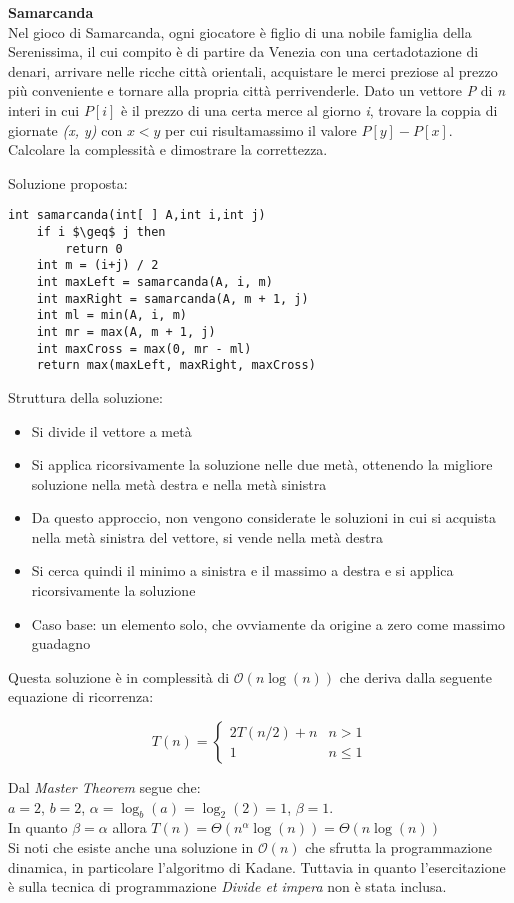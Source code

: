 \documentclass[../cheatSheetAlgoritmi.tex]{subfiles}
\begin{document}
\bigskip
\textbf{Samarcanda}\\
Nel gioco di Samarcanda, ogni giocatore è figlio di una nobile famiglia della Serenissima, il cui compito è di partire da Venezia con una certadotazione di denari, arrivare nelle ricche città orientali, acquistare le merci preziose al prezzo più conveniente e tornare alla propria città perrivenderle. Dato un vettore \textit{P} di \textit{n} interi in cui $P[i]$ è il prezzo di una certa merce al giorno \textit{i}, trovare la coppia di giornate \textit{(x, y)} con $x < y$ per cui risultamassimo il valore $P[y]-P[x]$. Calcolare la complessità e dimostrare la correttezza.

\bigskip
Soluzione proposta:
\begin{lstlisting}[caption=Samarcanda]
int samarcanda(int[ ] A,int i,int j)
	if i $\geq$ j then
    	return 0
  	int m = (i+j) / 2
  	int maxLeft = samarcanda(A, i, m)
  	int maxRight = samarcanda(A, m + 1, j)
  	int ml = min(A, i, m)
  	int mr = max(A, m + 1, j)
  	int maxCross = max(0, mr - ml)
  	return max(maxLeft, maxRight, maxCross)
\end{lstlisting}
Struttura della soluzione:
\begin{itemize}
	\item Si divide il vettore a metà
	\item Si applica ricorsivamente la soluzione nelle due metà, ottenendo la migliore soluzione nella metà destra e nella metà sinistra
	\item Da questo approccio, non vengono considerate le soluzioni in cui si acquista nella metà sinistra del vettore, si vende nella metà destra
	\item Si cerca quindi il minimo a sinistra e il massimo a destra e si applica ricorsivamente la soluzione
	\item Caso base: un elemento solo, che ovviamente da origine a zero come massimo guadagno
\end{itemize}
Questa soluzione è in complessità di $\mathcal{O}(n\log(n))$ che deriva dalla seguente equazione di ricorrenza:
\begin{center}
	\begin{equation*}
  		T(n)=\begin{cases}
    		2T(n/2) + n & \text{$n > 1$}\\
    		1 & \text{$n \leq 1$}
  		\end{cases}
	\end{equation*}
\end{center}

Dal \textit{Master Theorem} segue che: \\
$a = 2$, $b = 2$, $\alpha = \log_b(a) = \log_2(2) = 1$, $\beta = 1$. \\ 
In quanto $\beta = \alpha$ allora $T(n) = \Theta(n^{\alpha}\log(n)) = \Theta(n\log(n))$ \\
Si noti che esiste anche una soluzione in $\mathcal{O}(n)$ che sfrutta la programmazione dinamica, in particolare l'algoritmo di Kadane. Tuttavia in quanto l'esercitazione è sulla tecnica di programmazione \textit{Divide et impera} non è stata inclusa.
\end{document}
